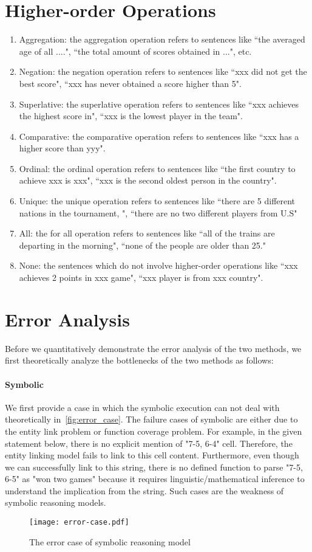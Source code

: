 \documentclass{article} \usepackage{iclr2020_conference,times}
\begin{document}
\section{Higher-order Operations}
\label{app-ops}
\begin{enumerate}
    \item Aggregation: the aggregation operation refers to sentences like ``the averaged age of all ....", ``the total amount of scores obtained in ...", etc.
    \item Negation: the negation operation refers to sentences like ``xxx did not get the best score", ``xxx has never obtained a score higher than 5".
    \item Superlative: the superlative operation refers to sentences like ``xxx achieves the highest score in", ``xxx is the lowest player in the team".
    \item Comparative: the comparative operation refers to sentences like ``xxx has a higher score than yyy".
    \item Ordinal: the ordinal operation refers to sentences like ``the first country to achieve xxx is xxx", ``xxx is the second oldest person in the country".
    \item Unique: the unique operation refers to sentences like ``there are 5 different nations in the tournament, ", ``there are no two different players from U.S"
    \item All: the for all operation refers to sentences like ``all of the trains are departing in the morning", ``none of the people are older than 25."
    \item None: the sentences which do not involve higher-order operations like ``xxx achieves 2 points in xxx game", ``xxx player is from xxx country".
\end{enumerate}

\section{Error Analysis}
Before we quantitatively demonstrate the error analysis of the two methods, we first theoretically analyze the bottlenecks of the two methods as follows:
\paragraph{Symbolic}
We first provide a case in which the symbolic execution can not deal with theoretically in~\autoref{fig:error_case}. The failure cases of symbolic are either due to the entity link problem or function coverage problem. For example, in the given statement below, there is no explicit mention of "7-5, 6-4" cell. Therefore, the entity linking model fails to link to this cell content. Furthermore, even though we can successfully link to this string, there is no defined function to parse "7-5, 6-5" as "won two games" because it requires linguistic/mathematical inference to understand the implication from the string. Such cases are the weakness of symbolic reasoning models.
\begin{figure}[thb]
    \centering
    \texttt{[image: error-case.pdf]}
    \caption{The error case of symbolic reasoning model}
    \label{fig:error_case}
\end{figure}
\end{document}
